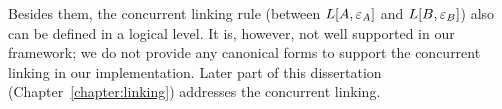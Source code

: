 Besides them, 
the concurrent linking rule (between $L[A, {\varepsilon}_A]$ and $L[B, {\varepsilon}_B]$) 
also can be defined in a logical level. 
It is, however, not well supported in our framework; we do not provide
any canonical forms to support the concurrent linking
in our implementation.
Later part of this dissertation (Chapter~\ref{chapter:linking}) addresses the concurrent linking. 



